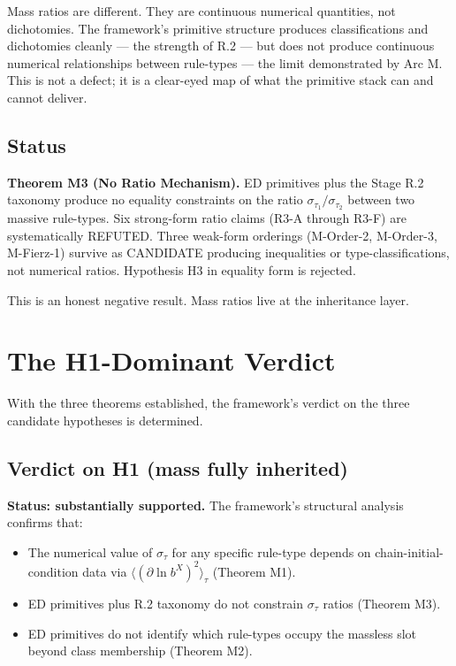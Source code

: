 \documentclass[11pt,a4paper]{article}
\begin{document}
Mass ratios are different. They are continuous numerical quantities, not dichotomies. The framework's primitive structure produces classifications and dichotomies cleanly --- the strength of R.2 --- but does not produce continuous numerical relationships between rule-types --- the limit demonstrated by Arc M. This is not a defect; it is a clear-eyed map of what the primitive stack can and cannot deliver.

\subsection{Status}

\textbf{Theorem M3 (No Ratio Mechanism).} ED primitives plus the Stage R.2 taxonomy produce no equality constraints on the ratio $\sigma_{\tau_1}/\sigma_{\tau_2}$ between two massive rule-types. Six strong-form ratio claims (R3-A through R3-F) are systematically REFUTED. Three weak-form orderings (M-Order-2, M-Order-3, M-Fierz-1) survive as CANDIDATE producing inequalities or type-classifications, not numerical ratios. Hypothesis H3 in equality form is rejected.

This is an honest negative result. Mass ratios live at the inheritance layer.

\section{The H1-Dominant Verdict}

With the three theorems established, the framework's verdict on the three candidate hypotheses is determined.

\subsection{Verdict on H1 (mass fully inherited)}

\textbf{Status: substantially supported.} The framework's structural analysis confirms that:

\begin{itemize}[noitemsep]
  \item The numerical value of $\sigma_\tau$ for any specific rule-type depends on chain-initial-condition data via $\langle(\partial\ln b^X)^2\rangle_\tau$ (Theorem M1).
  \item ED primitives plus R.2 taxonomy do not constrain $\sigma_\tau$ ratios (Theorem M3).
  \item ED primitives do not identify which rule-types occupy the massless slot beyond class membership (Theorem M2).
\end{itemize}
\end{document}
